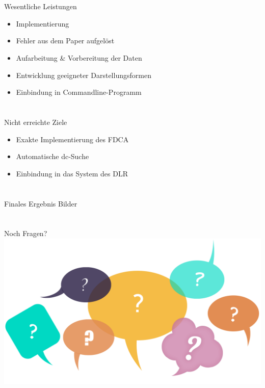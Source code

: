 \documentclass[12pt, xcolor={usenames,dvipsnames,svgnames,x11names,table}]{beamer}
\begin{document}
	
	\section{}
	\begin{frame}{Wesentliche Leistungen}{}
		\begin{itemize}
			\item Implementierung %
			\item Fehler aus dem Paper aufgelöst %
			\item Aufarbeitung \& Vorbereitung der Daten
			\item Entwicklung geeigneter Darstellungsformen
			\item Einbindung in Commandline-Programm
		\end{itemize}		%
	\end{frame}
	

	\section{}
	\begin{frame}{Nicht erreichte Ziele}{}
		\begin{itemize}
			\item Exakte Implementierung des FDCA
			\item Automatische dc-Suche
			\item Einbindung in das System des DLR
		\end{itemize}
	\end{frame}
	
	
	\section{}
	\begin{frame}{Finales Ergebnis}{}
		Bilder
	\end{frame}
	
	
	\section{}	
	
	\section{}
	\begin{frame}{Noch Fragen?}
		\includegraphics[width=\textwidth]{fragen}
	\end{frame}
\end{document}
